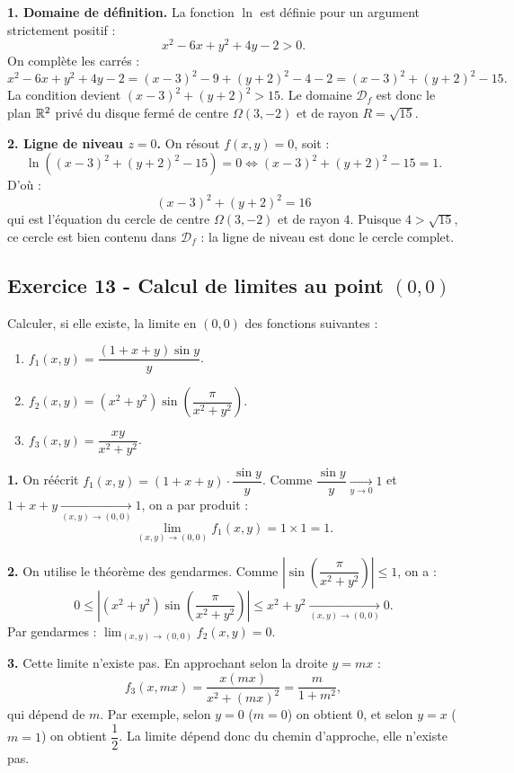 \documentclass[12pt,a4paper]{article}
\begin{document}
\begin{boitecorrige}
\textbf{1. Domaine de définition.} La fonction $\ln$ est définie pour un argument strictement positif :
\[
x^2 - 6x + y^2 + 4y - 2 > 0.
\]
On complète les carrés :
\[
x^2 - 6x + y^2 + 4y - 2 = (x-3)^2 - 9 + (y+2)^2 - 4 - 2 = (x-3)^2 + (y+2)^2 - 15.
\]
La condition devient $(x-3)^2 + (y+2)^2 > 15$. Le domaine $\mathcal{D}_f$ est donc le plan $\mathbb{R}^2$ privé du disque fermé de centre $\Omega(3,-2)$ et de rayon $R = \sqrt{15}$.

\textbf{2. Ligne de niveau $z=0$.} On résout $f(x,y) = 0$, soit :
\[
\ln\!\left((x-3)^2 + (y+2)^2 - 15\right) = 0 \iff (x-3)^2 + (y+2)^2 - 15 = 1.
\]
D'où :
\[
\boxed{(x-3)^2 + (y+2)^2 = 16}
\]
qui est l'équation du cercle de centre $\Omega(3,-2)$ et de rayon $4$. Puisque $4 > \sqrt{15}$, ce cercle est bien contenu dans $\mathcal{D}_f$ : la ligne de niveau est donc le cercle complet.

\end{boitecorrige}

\subsection*{Exercice 13 - Calcul de limites au point $(0,0)$ \niveau{\moyen}}

\begin{boiteexercice}
Calculer, si elle existe, la limite en $(0,0)$ des fonctions suivantes :
\begin{enumerate}
  \item $f_1(x,y) = \dfrac{(1+x+y)\sin y}{y}$.
  \item $f_2(x,y) = (x^2+y^2)\sin\!\left(\dfrac{\pi}{x^2+y^2}\right)$.
  \item $f_3(x,y) = \dfrac{xy}{x^2+y^2}$.
\end{enumerate}
\end{boiteexercice}

\begin{boitecorrige}
\textbf{1.} On réécrit $f_1(x,y) = (1+x+y)\cdot\dfrac{\sin y}{y}$. Comme $\dfrac{\sin y}{y} \xrightarrow[y\to 0]{} 1$ et $1+x+y \xrightarrow[(x,y)\to(0,0)]{} 1$, on a par produit :
\[
\lim_{(x,y)\to(0,0)} f_1(x,y) = 1 \times 1 = \boxed{1}.
\]

\textbf{2.} On utilise le théorème des gendarmes. Comme $\left|\sin\!\left(\dfrac{\pi}{x^2+y^2}\right)\right| \leq 1$, on a :
\[
0 \leq \left|(x^2+y^2)\sin\!\left(\dfrac{\pi}{x^2+y^2}\right)\right| \leq x^2+y^2 \xrightarrow[(x,y)\to(0,0)]{} 0.
\]
Par gendarmes : $\lim_{(x,y)\to(0,0)} f_2(x,y) = \boxed{0}$.

\textbf{3.} Cette limite n'existe pas. En approchant selon la droite $y = mx$ :
\[
f_3(x, mx) = \dfrac{x(mx)}{x^2 + (mx)^2} = \dfrac{m}{1+m^2},
\]
qui dépend de $m$. Par exemple, selon $y=0$ ($m=0$) on obtient $0$, et selon $y=x$ ($m=1$) on obtient $\dfrac{1}{2}$. La limite dépend donc du chemin d'approche, elle n'existe pas.

\end{boitecorrige}
\end{document}
